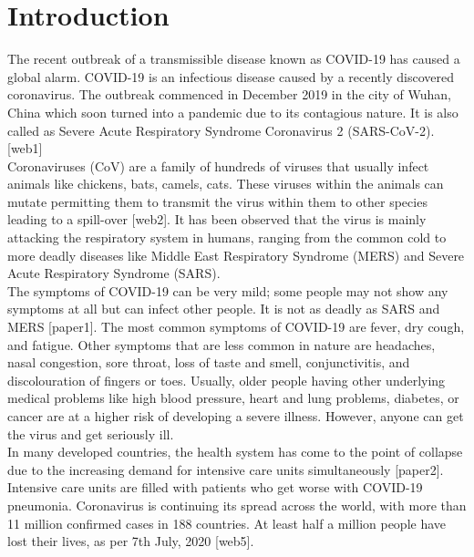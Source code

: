 \documentclass[12pt]{revtex4}
\begin{document}
\section{Introduction}
The recent outbreak of a transmissible disease known as COVID-19 has caused a global alarm. COVID-19 is an infectious disease caused by a recently discovered coronavirus. The outbreak commenced in December 2019 in the city of Wuhan, China which soon turned into a pandemic due to its contagious nature. It is also called as Severe Acute Respiratory Syndrome Coronavirus 2 (SARS-CoV-2). [web1]
\\Coronaviruses (CoV) are a family of hundreds of viruses that usually infect animals like chickens, bats, camels, cats. These viruses within the animals can mutate permitting them to transmit the virus within them to other species leading to a spill-over [web2]. It has been observed that the virus is mainly attacking the respiratory system in humans, ranging from the common cold to more deadly diseases like Middle East Respiratory Syndrome (MERS) and Severe Acute Respiratory Syndrome (SARS).
\\The symptoms of COVID-19 can be very mild; some people may not show any symptoms at all but can infect other people. It is not as deadly as SARS and MERS [paper1]. The most common symptoms of COVID-19 are fever, dry cough, and fatigue. Other symptoms that are less common in nature are headaches, nasal congestion, sore throat, loss of taste and smell, conjunctivitis, and discolouration of fingers or toes. Usually, older people having other underlying medical problems like high blood pressure, heart and lung problems, diabetes, or cancer are at a higher risk of developing a severe illness. However, anyone can get the virus and get seriously ill.
\\In many developed countries, the health system has come to the point of collapse due to the increasing demand for intensive care units simultaneously [paper2]. Intensive care units are filled with patients who get worse with COVID-19 pneumonia. Coronavirus is continuing its spread across the world, with more than 11 million confirmed cases in 188 countries. At least half a million people have lost their lives, as per 7th July, 2020 [web5]. 
\end{document}
